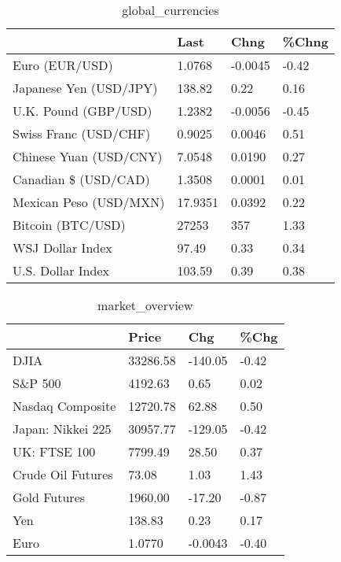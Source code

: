 \documentclass{article}%
\begin{document}
%


\begin{table}[htbp]%
\caption{global\_currencies}%
\centering%
\begin{adjustbox}{width=1\textwidth}%
\begin{tabular}{llll}
\toprule
                       &    Last &    Chng & \%Chng \\
\midrule
        Euro (EUR/USD) &  1.0768 & -0.0045 & -0.42 \\
Japanese Yen (USD/JPY) &  138.82 &    0.22 &  0.16 \\
  U.K. Pound (GBP/USD) &  1.2382 & -0.0056 & -0.45 \\
 Swiss Franc (USD/CHF) &  0.9025 &  0.0046 &  0.51 \\
Chinese Yuan (USD/CNY) &  7.0548 &  0.0190 &  0.27 \\
  Canadian \$ (USD/CAD) &  1.3508 &  0.0001 &  0.01 \\
Mexican Peso (USD/MXN) & 17.9351 &  0.0392 &  0.22 \\
     Bitcoin (BTC/USD) &   27253 &     357 &  1.33 \\
      WSJ Dollar Index &   97.49 &    0.33 &  0.34 \\
     U.S. Dollar Index &  103.59 &    0.39 &  0.38 \\
\bottomrule
\end{tabular}
%
\end{adjustbox}%
\end{table}

%


\begin{table}[htbp]%
\caption{market\_overview}%
\centering%
\begin{adjustbox}{width=1\textwidth}%
\begin{tabular}{llll}
\toprule
                  &    Price &     Chg &  \%Chg \\
\midrule
             DJIA & 33286.58 & -140.05 & -0.42 \\
          S\&P 500 &  4192.63 &    0.65 &  0.02 \\
 Nasdaq Composite & 12720.78 &   62.88 &  0.50 \\
Japan: Nikkei 225 & 30957.77 & -129.05 & -0.42 \\
     UK: FTSE 100 &  7799.49 &   28.50 &  0.37 \\
Crude Oil Futures &    73.08 &    1.03 &  1.43 \\
     Gold Futures &  1960.00 &  -17.20 & -0.87 \\
              Yen &   138.83 &    0.23 &  0.17 \\
             Euro &   1.0770 & -0.0043 & -0.40 \\
\bottomrule
\end{tabular}
%
\end{adjustbox}%
\end{table}

%
\end{document}
